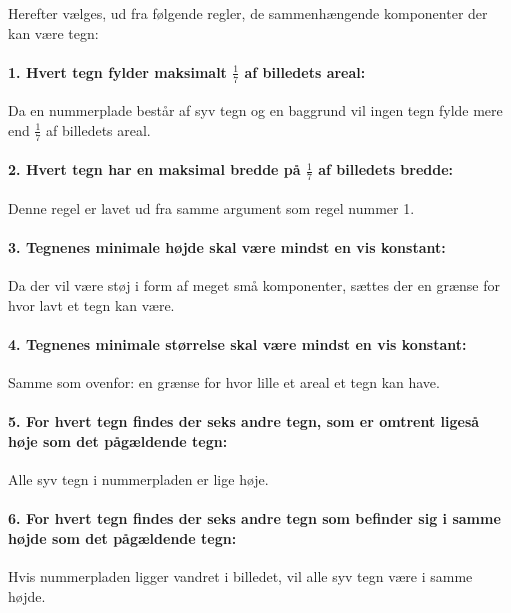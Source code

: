 

Herefter vælges, ud fra følgende regler, de sammenhængende komponenter der kan være tegn:

\paragraph{1. Hvert tegn fylder maksimalt $\frac{1}{7}$ af billedets areal:} Da en nummerplade består af syv tegn og en baggrund vil ingen tegn fylde mere end $\frac{1}{7}$ af billedets areal. 
\paragraph{2. Hvert tegn har en maksimal bredde på $\frac{1}{7}$ af billedets bredde:} Denne regel er lavet ud fra samme argument som regel nummer 1.
\paragraph{3. Tegnenes minimale højde skal være mindst en vis konstant:} Da der vil være støj i form af meget små komponenter, sættes der en grænse for hvor lavt et tegn kan være.%
\paragraph{4. Tegnenes minimale størrelse skal være mindst en vis konstant:} Samme som ovenfor: en grænse for hvor lille et areal et tegn kan have.%
\paragraph{5. For hvert tegn findes der seks andre tegn, som er omtrent ligeså høje som det pågældende tegn:} Alle syv tegn i nummerpladen er lige høje.
\paragraph{6. For hvert tegn findes der seks andre tegn som befinder sig i samme højde som det pågældende tegn:} Hvis nummerpladen ligger vandret i billedet, vil alle syv tegn være i samme højde.
